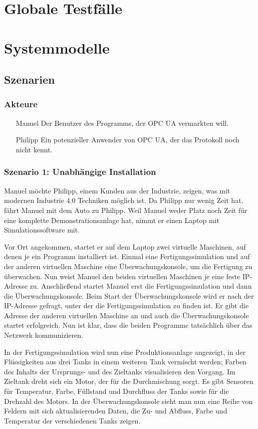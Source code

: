 \documentclass[parskip=full]{scrartcl}
\begin{document}
\pagebreak
\section{Globale Testfälle}
\Blindtext[1]

\pagebreak
\section{Systemmodelle}
\subsection{Szenarien}
\subsubsection*{Akteure}
\begin{itemize}
 \item[Manuel] Der Benutzer des Programms, der OPC UA vermarkten will.
 \item[Philipp] Ein potenzieller Anwender von OPC UA, der das Protokoll noch nicht kennt.
\end{itemize}

\subsubsection{Szenario 1: Unabhängige Installation}
Manuel möchte Philipp, einem Kunden aus der Industrie, zeigen, was mit modernen Industrie 4.0 Techniken möglich ist.
Da Philipp nur wenig Zeit hat, fährt Manuel mit dem Auto zu Philipp. Weil Manuel weder Platz 
noch Zeit für eine komplette Demonstrationsanlage hat, nimmt er einen Laptop mit Simulationssoftware mit.

Vor Ort angekommen, startet er auf dem Laptop zwei virtuelle Maschinen, auf denen je ein Programm installiert ist. 
Einmal eine Fertigungssimulation und auf der anderen virtuellen Maschine eine Überwachungskonsole, um die Fertigung zu überwachen.
Nun weist Manuel den beiden virtuellen Maschinen je eine feste IP-Adresse zu.
Anschlie{\ss}end startet Manuel erst die Fertigungssimulation und dann die Überwachungskonsole.
Beim Start der Überwachungskonsole wird er nach der IP-Adresse gefragt, unter der die Fertigungssimulation zu finden ist. 
Er gibt die Adresse der anderen virtuellen Maschine an und auch die Überwachungskonsole startet erfolgreich. 
Nun ist klar, dass die beiden Programme tatsächlich über das Netzwerk kommunizieren.

In der Fertigungssimulation wird nun eine Produktionsanlage angezeigt, in der Flüssigkeiten aus drei Tanks
in einem weiteren Tank vermischt werden; Farben des Inhalts der Ursprungs- und des Zieltanks visualisieren den Vorgang. 
Im Zieltank dreht sich ein Motor, der für die Durchmischung sorgt.
Es gibt Sensoren für Temperatur, Farbe, Füllstand und Durchfluss der Tanks sowie für die Drehzahl des Motors.
In der Überwachungskonsole sieht man nun eine Reihe von Feldern mit sich aktualisierenden Daten,
die Zu- und Abfluss, Farbe und Temperatur der verschiedenen Tanks zeigen.
\end{document}
